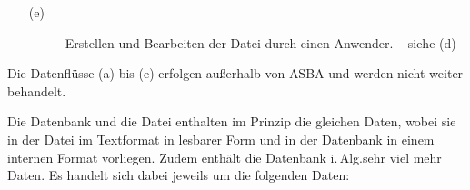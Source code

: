 \documentclass[english,ngerman,parskip=half,headsepline,footsepline,
	fleqn,notitlepage]{scrreprt}
\makeatletter
\newcommand*{\textiAlg}{i.\@\,Alg.\@ }
\newcommand*{\glsidx}[1]{\gls{#1}\idx{\gls{#1}}}%
\newcommand*{\ASBA}{\textsf{\glsidx{ASBA}}}
\makeatother
\begin{document}
\begin{itemize}
		\item[(e)] \label{dat:TerminalDatei}
		\begin{description}
			\item[]\label{dat:Terminal22Datei}
			Erstellen und Bearbeiten der Datei durch einen Anwender.
			-- siehe (d)
		\end{description}

	\end{itemize}
	Die Datenflüsse (a) bis (e) erfolgen außerhalb von \ASBA
	und werden nicht weiter behandelt.

	Die Datenbank und die Datei enthalten im Prinzip die gleichen Daten,
	wobei sie in der Datei im Textformat in lesbarer Form
	und in der Datenbank in einem internen Format vorliegen.
	Zudem enthält die Datenbank \textiAlg sehr viel mehr Daten.
	Es handelt sich dabei jeweils um die folgenden Daten:
\end{document}

